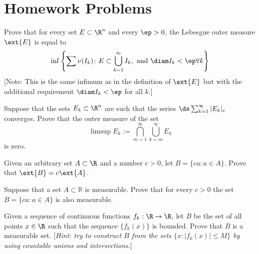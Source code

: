 \newpage
\section{Homework Problems}
\vspace{0.5cm}


\begin{hw} \label{hw:1}
Prove that for every set $E \subset \R^n$ and every $\ep>0$, the Lebesgue outer measure $\ext{E}$ is equal to
	\[
	\inf \left\{ \sum \nu(I_k) \colon  E \subset \bigcup_{k=1}^\infty I_k, \text{ and } \diam I_k < \ep \forall k \right\}
	\]
[Note: This is the same infimum as in the definition of $\ext{E}$ but with the additional requirement $\diam I_k < \ep$ for all $k$.] \\
\end{hw}


\begin{hw} \label{hw:2}
Suppose that the sets $E_k \subset \R^n$ are such that the series $\ds\sum_{k=1}^\infty |E_k|_e$ converges. Prove that the outer measure of the set
	\[
	\limsup E_k:= \bigcap_{m=1}^\infty \bigcup_{k=m}^\infty E_k
	\]
is zero. \\
\end{hw}






\begin{hw} \label{hw:3}
Given an arbitrary set $A \subset \R$ and a number $c>0$, let $B = \{ ca \colon a \in A \}$. Prove that $\ext{B}= c \ext{A}$. \\
\end{hw}


\begin{hw} \label{hw:4}
Suppose that a set $A\subset\mathbb R$ is measurable. Prove that for every $c>0$ the set $B = \{ca\colon a\in A\}$ is also measurable. \\
\end{hw}


\begin{hw} \label{hw:5}
Given a sequence of continuous functions $f_k: \R \to \R$, let $B$ be the set of all points $x \in \R$ such that the sequence $\{ f_k(x) \}$ is bounded. Prove that $B$ is a measurable set. [\emph{Hint: try to construct $B$ from the sets $\{x \colon |f_k(x)| \leq M\}$ by using countable unions and intersections.}] \\
\end{hw}


